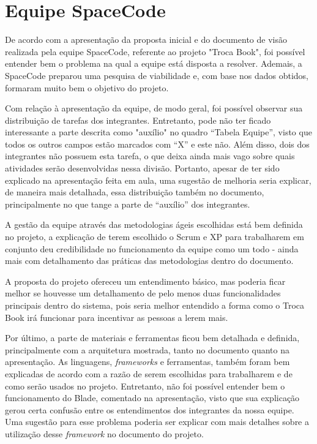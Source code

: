 \section{Equipe SpaceCode}
De acordo com a apresentação da proposta inicial e do documento de visão realizada pela equipe SpaceCode, referente ao projeto "Troca Book", foi possível entender bem o problema na qual a equipe está disposta a resolver. Ademais, a SpaceCode preparou uma pesquisa de viabilidade e, com base nos dados obtidos, formaram muito bem o objetivo do projeto.

Com relação à apresentação da equipe, de modo geral, foi possível observar sua distribuição de tarefas dos integrantes. Entretanto, pode não ter ficado interessante a parte descrita como "auxílio" no quadro “Tabela Equipe”, visto que todos os outros campos estão marcados com “X” e este não. Além disso, dois dos integrantes não possuem esta tarefa, o que deixa ainda mais vago sobre quais atividades serão desenvolvidas nessa divisão. Portanto, apesar de ter sido explicado na apresentação feita em aula, uma sugestão de melhoria seria explicar, de maneira mais detalhada, essa distribuição também no documento, principalmente no que tange a parte de “auxílio” dos integrantes.

A gestão da equipe através das metodologias ágeis escolhidas está bem definida no projeto, a explicação de terem escolhido o Scrum e XP para trabalharem em conjunto deu credibilidade no funcionamento da equipe como um todo - ainda mais com detalhamento das práticas das metodologias dentro do documento.

A proposta do projeto ofereceu um entendimento básico, mas poderia ficar melhor se houvesse um detalhamento de pelo menos duas funcionalidades principais dentro do sistema, pois seria melhor entendido a forma como o Troca Book irá funcionar para incentivar as pessoas a lerem mais.

Por último, a parte de materiais e ferramentas ficou bem detalhada e definida, principalmente com a arquitetura mostrada, tanto no documento quanto na apresentação. As linguagens, \textsl{frameworks} e ferramentas, também foram bem explicadas de acordo com a razão de serem escolhidas para trabalharem e de como serão usados no projeto. Entretanto, não foi possível entender bem o funcionamento do Blade, comentado na apresentação, visto que sua explicação gerou certa confusão entre os entendimentos dos integrantes da nossa equipe. Uma sugestão para esse problema poderia ser explicar com mais detalhes sobre a utilização desse \textsl{framework} no documento do projeto.

